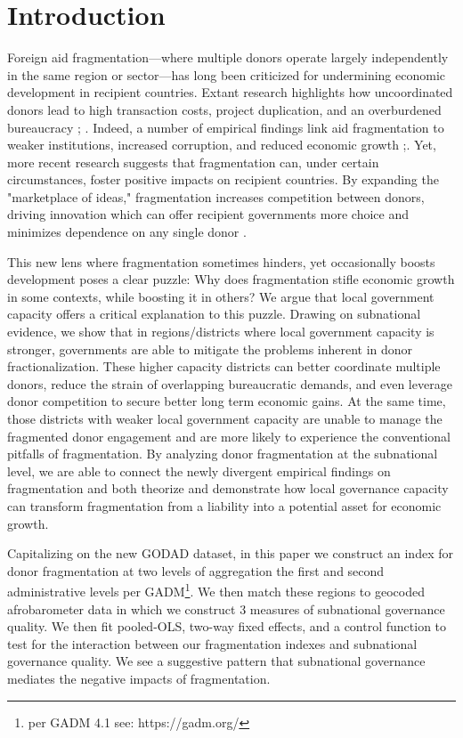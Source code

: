 \documentclass[11pt]{article}
\begin{document}
\section{Introduction}
Foreign aid fragmentation—where multiple donors operate largely independently in the same region or sector—has long been criticized for undermining economic development in recipient countries. Extant research highlights how uncoordinated donors lead to high transaction costs, project duplication, and an overburdened bureaucracy \citep{Acharyaetal_2006}; \citep{knack_donor_2007}. Indeed, a number of empirical findings link aid fragmentation to weaker institutions, increased corruption, and reduced economic growth \citep{knack_donor_2007};. Yet, more recent research suggests that fragmentation can, under certain circumstances, foster positive impacts on recipient countries. By expanding the "marketplace of ideas," fragmentation increases competition between donors, driving innovation which can offer recipient governments more choice and minimizes dependence on any single donor \citep{gehring_aid_2017}.  

This new lens where fragmentation sometimes hinders, yet occasionally boosts development poses a clear puzzle: Why does fragmentation stifle economic growth in some contexts, while boosting it in others? We argue that local government capacity offers a critical explanation to this puzzle. Drawing on subnational evidence, we show that in regions/districts where local government capacity is stronger, governments are able to mitigate the problems inherent in donor fractionalization. These higher capacity districts can better coordinate multiple donors, reduce the strain of overlapping bureaucratic demands, and even leverage donor competition to secure better long term economic gains. At the same time, those districts with weaker local government capacity are unable to manage the fragmented donor engagement and are more likely to experience the conventional pitfalls of fragmentation. By analyzing donor fragmentation at the subnational level, we are able to connect the newly divergent empirical findings on fragmentation and both theorize and demonstrate how local governance capacity can transform fragmentation from a liability into a potential asset for economic growth. 

Capitalizing on the new GODAD dataset, in this paper we construct an index for donor fragmentation at two levels of aggregation the first and second administrative levels per GADM\footnote{per GADM 4.1 see: https://gadm.org/}. We then match these regions to geocoded afrobarometer data in which we construct 3 measures of subnational governance quality. We then fit pooled-OLS, two-way fixed effects, and a control function to test for the interaction between our fragmentation indexes and subnational governance quality. We see a suggestive pattern that subnational governance mediates the negative impacts of fragmentation. 
\end{document}
